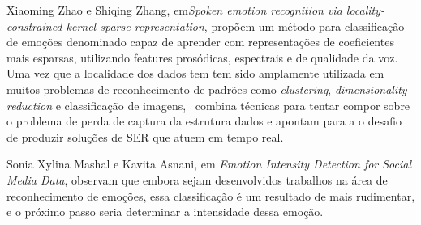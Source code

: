Xiaoming Zhao e Shiqing Zhang, em\textit{Spoken emotion recognition via locality-constrained kernel sparse representation}\cite{32.31}, propõem um método para classificação de emoções denominado capaz de aprender com representações de coeficientes mais esparsas, utilizando features prosódicas, espectrais e de qualidade da voz. Uma vez que a localidade dos dados tem tem sido amplamente utilizada em muitos problemas de reconhecimento de padrões como \textit{clustering}, \textit{dimensionality reduction} e classificação de imagens,~\cite{32.31} combina técnicas para tentar compor sobre o problema de perda de captura da estrutura dados e apontam para a o desafio de produzir soluções de \acrshort{SER} que atuem em tempo real.

Sonia Xylina Mashal e Kavita Asnani, em \textit{Emotion Intensity Detection for Social Media Data}\cite{14}, observam que embora sejam desenvolvidos trabalhos na área de reconhecimento de emoções, essa classificação é um resultado de mais rudimentar, e o próximo passo seria determinar a intensidade dessa emoção.

